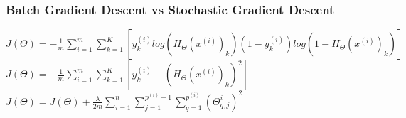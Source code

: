 \documentclass{beamer}
\begin{document}
    \begin{frame}
    	\frametitle{Batch Gradient Descent vs Stochastic Gradient Descent}
    	$J(\Theta)=-\frac{1}{m}\sum\limits_{i=1}^{m}\sum\limits_{k=1}^{K} \left[y_{k}^{(i)}log(H_{\Theta}(x^{(i)})_{k})  (1-y_{k}^{(i)})log(1-H_{\Theta}(x^{(i)})_{k}) \right]$\\
    	$J(\Theta)=-\frac{1}{m}\sum\limits_{i=1}^{m}\sum\limits_{k=1}^{K} \left[y_{k}^{(i)}-(H_{\Theta}(x^{(i)})_{k})^{2} \right]$	
    	$J(\Theta)=J(\Theta)+\frac{\lambda}{2m} \sum\limits_{i=1}^{n}\sum\limits_{j=1}^{p^{(i)}-1} \sum\limits_{q=1}^{p^{(i)}}(\Theta_{q,j}^i)^{2} $\\			
    \end{frame}
\end{document}
